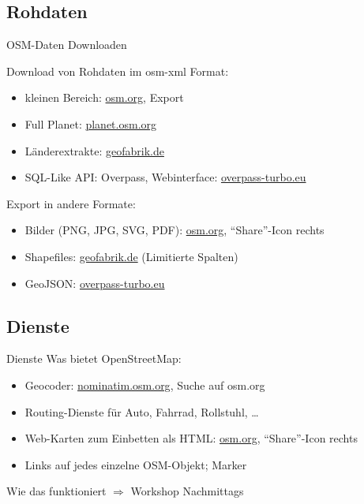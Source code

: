\documentclass{beamer}
\begin{document}
\subsection{Rohdaten}

\begin{frame}{OSM-Daten Downloaden}

	Download von Rohdaten im osm-xml Format:
\begin{itemize}
	\item kleinen Bereich: \href{http://osm.org}{osm.org}, Export
	\item Full Planet: \href{http://planet.osm.org}{planet.osm.org}
	\item Länderextrakte: \href{http://download.geofabrik.de}{geofabrik.de}
	\item SQL-Like API: Overpass, Webinterface: \href{http://overpass-turbo.eu}{overpass-turbo.eu}
\end{itemize}
\pause
Export in andere Formate: 
\begin{itemize}
	\item Bilder (PNG, JPG, SVG, PDF): \href{http://osm.org}{osm.org}, "`Share"'-Icon rechts
	\item Shapefiles: \href{http://download.geofabrik.de}{geofabrik.de} (Limitierte Spalten)
	\item GeoJSON: \href{http://overpass-turbo.eu}{overpass-turbo.eu}
\end{itemize}

\end{frame}

\subsection{Dienste}

\begin{frame}{Dienste}
	Was bietet OpenStreetMap:
\begin{itemize}
	\item Geocoder: \href{http://nominatim.osm.org}{nominatim.osm.org}, Suche auf osm.org
		\pause
	\item Routing-Dienste für Auto, Fahrrad, Rollstuhl, \dots
		\pause
	\item Web-Karten zum Einbetten als HTML: \href{http://osm.org}{osm.org}, "`Share"'-Icon rechts
		\pause
	\item Links auf jedes einzelne OSM-Objekt; Marker
\end{itemize}

Wie das funktioniert $\Rightarrow$ Workshop Nachmittags

\end{frame}
\end{document}
